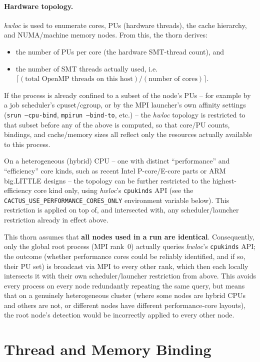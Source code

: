 \paragraph{Hardware topology.} \emph{hwloc} is used to enumerate cores,
PUs (hardware threads), the cache hierarchy, and NUMA/machine memory
nodes. From this, the thorn derives:
\begin{itemize}
\item the number of PUs per core (the hardware SMT-thread count), and
\item the number of SMT threads actually used, i.e.
  $\lceil (\text{total OpenMP threads on this host}) /
  (\text{number of cores}) \rceil$.
\end{itemize}
If the process is already confined to a subset of the node's PUs --
for example by a job scheduler's cpuset/cgroup, or by the MPI
launcher's own affinity settings (\texttt{srun --cpu-bind},
\texttt{mpirun --bind-to}, etc.) -- the \emph{hwloc} topology is
restricted to that subset before any of the above is computed, so that
core/PU counts, bindings, and cache/memory sizes all reflect only the
resources actually available to this process.

On a heterogeneous (hybrid) CPU -- one with distinct ``performance''
and ``efficiency'' core kinds, such as recent Intel P-core/E-core
parts or ARM big.LITTLE designs -- the topology can be further
restricted to the highest-efficiency core kind only, using
\emph{hwloc}'s \texttt{cpukinds} API (see the
\texttt{CACTUS\_USE\_PERFORMANCE\_CORES\_ONLY} environment variable
below). This restriction is applied on top of, and intersected with,
any scheduler/launcher restriction already in effect above.

This thorn assumes that \textbf{all nodes used in a run are
identical}. Consequently, only the global root process (MPI rank~0)
actually queries \emph{hwloc}'s \texttt{cpukinds} API; the outcome
(whether performance cores could be reliably identified, and if so,
their PU set) is broadcast via MPI to every other rank, which then
each locally intersects it with their own scheduler/launcher
restriction from above. This avoids every process on every node
redundantly repeating the same query, but means that on a genuinely
heterogeneous cluster (where some nodes are hybrid CPUs and others are
not, or different nodes have different performance-core layouts), the
root node's detection would be incorrectly applied to every other
node.

\section{Thread and Memory Binding}


